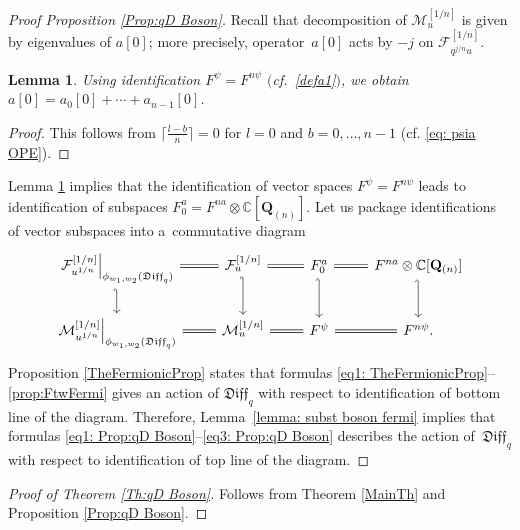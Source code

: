 \documentclass[pdftex]{sigma}
\numberwithin{equation}{section}
\newtheorem{Lemma}[Theorem]{Lemma}
\theoremstyle{definition}
\newcommand{\qD}{\mathfrak{Diff}_q}
\newcommand{\Q}{\mathbf{Q}_{(n)}}
\begin{document}
\begin{proof}[Proof Proposition \ref{Prop:qD Boson}]
Recall that decomposition of $\mathcal{M}^{[1/n]}_{u}$ is given by eigenvalues of $a[0]$; more precisely, operator~$a[0]$ acts by $-j$ on $ \mathcal{F}^{[1/n]}_{q^{j/n} u}$.
\begin{Lemma} \label{lemma: zero mode of a, npsi is psi}
Using identification $F^{\psi}=F^{n \psi}$ $($cf.~\eqref{defa1}$)$, we obtain $a[0] = a_0[0]+\cdots + a_{n-1}[0]$.
\end{Lemma}
\begin{proof}[Proof]
This follows from $\big\lceil \frac{l-b}{n}\big\rceil =0$ for $l=0$ and $b=0, \dots, n-1$ (cf. \eqref{eq: psia OPE}).
\end{proof}
Lemma \ref{lemma: zero mode of a, npsi is psi} implies that the identification of vector spaces $F^{ \psi}=F^{n\psi}$ leads to identification of subspaces $F^a_{0} = F^{na}\otimes \mathbb{C} [\Q]$. Let us package identifications of vector subspaces into a~commutative diagram
\[
\begin{tikzcd}
\left.\mathcal{F}^{[1/n]}_{u^{1/n}} \right|_{\phi_{w_1, w_2}(\qD)} \arrow[d, hook'] \arrow[r,equal] &
\mathcal{F}^{[1/n]}_{ u} \arrow[d, hook'] \arrow[r,equal] & F^a_{0} \arrow[d, hook'] \arrow[r,equal] & F^{na}\otimes \mathbb{C} [\Q] \arrow[d, hook']
\\
\left. \mathcal{M}^{[1/n]}_{u^{1/n}} \right|_{\phi_{w_1, w_2}(\qD)}
\arrow[r,equal] &
\mathcal{M}^{[1/n]}_{u} \arrow[r,equal] &
F^{\psi} \arrow[r,equal] &
F^{n \psi}.
\end{tikzcd}
\]
Proposition \ref{TheFermionicProp} states that formulas \eqref{eq1: TheFermionicProp}--\eqref{prop:FtwFermi} gives an action of $\qD$ with respect to identification of bottom line of the diagram. Therefore, Lemma~\ref{lemma: subst boson fermi} implies that formulas \eqref{eq1: Prop:qD Boson}--\eqref{eq3: Prop:qD Boson} describes the action of~$\qD$ with respect to identification of top line of the diagram.
\end{proof}

\begin{proof}[Proof of Theorem \ref{Th:qD Boson}] Follows from Theorem \ref{MainTh} and Proposition \ref{Prop:qD Boson}.
\end{proof}
\end{document}
